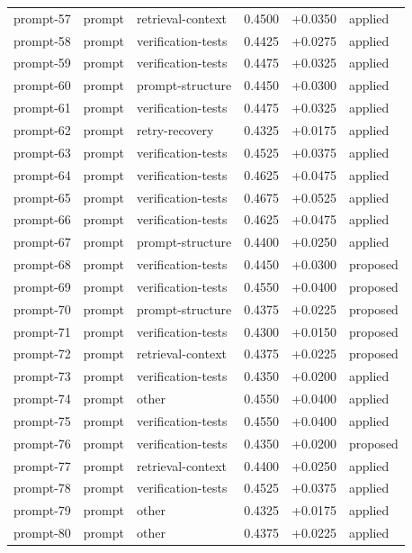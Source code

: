 \begin{center}
\begin{longtable}{llp{5.2cm}rrl}
prompt-57 & prompt & retrieval-context & 0.4500 & +0.0350 & applied \\
prompt-58 & prompt & verification-tests & 0.4425 & +0.0275 & applied \\
prompt-59 & prompt & verification-tests & 0.4475 & +0.0325 & applied \\
prompt-60 & prompt & prompt-structure & 0.4450 & +0.0300 & applied \\
prompt-61 & prompt & verification-tests & 0.4475 & +0.0325 & applied \\
prompt-62 & prompt & retry-recovery & 0.4325 & +0.0175 & applied \\
prompt-63 & prompt & verification-tests & 0.4525 & +0.0375 & applied \\
prompt-64 & prompt & verification-tests & 0.4625 & +0.0475 & applied \\
prompt-65 & prompt & verification-tests & 0.4675 & +0.0525 & applied \\
prompt-66 & prompt & verification-tests & 0.4625 & +0.0475 & applied \\
prompt-67 & prompt & prompt-structure & 0.4400 & +0.0250 & applied \\
prompt-68 & prompt & verification-tests & 0.4450 & +0.0300 & proposed \\
prompt-69 & prompt & verification-tests & 0.4550 & +0.0400 & proposed \\
prompt-70 & prompt & prompt-structure & 0.4375 & +0.0225 & proposed \\
prompt-71 & prompt & verification-tests & 0.4300 & +0.0150 & proposed \\
prompt-72 & prompt & retrieval-context & 0.4375 & +0.0225 & proposed \\
prompt-73 & prompt & verification-tests & 0.4350 & +0.0200 & applied \\
prompt-74 & prompt & other & 0.4550 & +0.0400 & applied \\
prompt-75 & prompt & verification-tests & 0.4550 & +0.0400 & applied \\
prompt-76 & prompt & verification-tests & 0.4350 & +0.0200 & proposed \\
prompt-77 & prompt & retrieval-context & 0.4400 & +0.0250 & applied \\
prompt-78 & prompt & verification-tests & 0.4525 & +0.0375 & applied \\
prompt-79 & prompt & other & 0.4325 & +0.0175 & applied \\
prompt-80 & prompt & other & 0.4375 & +0.0225 & applied \\

\end{longtable}
\end{center}

